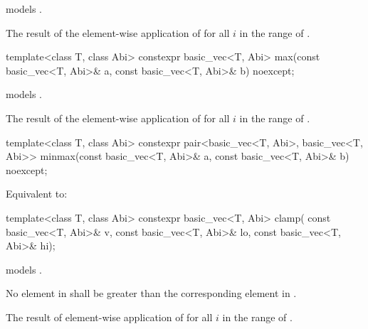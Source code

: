 \begin{itemdescr}
\pnum
\constraints
{} models .

\pnum
\returns
The result of the element-wise application of  for
all $i$ in the range of .
\end{itemdescr}

\begin{itemdecl}
template<class T, class Abi>
  constexpr basic_vec<T, Abi> max(const basic_vec<T, Abi>& a,
                                  const basic_vec<T, Abi>& b) noexcept;
\end{itemdecl}

\begin{itemdescr}
\pnum
\constraints
{} models .

\pnum
\returns
The result of the element-wise application of  for
all $i$ in the range of .
\end{itemdescr}

\begin{itemdecl}
template<class T, class Abi>
  constexpr pair<basic_vec<T, Abi>, basic_vec<T, Abi>>
    minmax(const basic_vec<T, Abi>& a, const basic_vec<T, Abi>& b) noexcept;
\end{itemdecl}

\begin{itemdescr}
\pnum
\effects
Equivalent to: 
\end{itemdescr}

\begin{itemdecl}
template<class T, class Abi>
  constexpr basic_vec<T, Abi> clamp(
    const basic_vec<T, Abi>& v, const basic_vec<T, Abi>& lo, const basic_vec<T, Abi>& hi);
\end{itemdecl}

\begin{itemdescr}
\pnum
\constraints
{} models .

\pnum
\expects
No element in  shall be greater than the corresponding element in
.

\pnum
\returns
The result of element-wise application of  for all $i$ in the range of .
\end{itemdescr}

